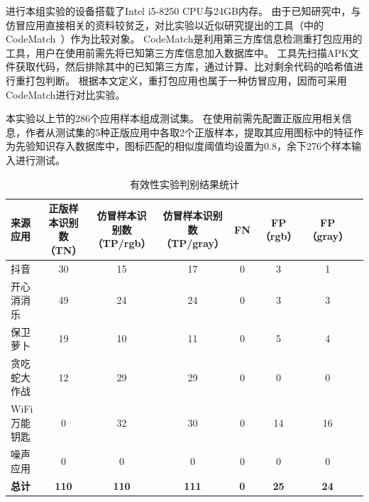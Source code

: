 进行本组实验的设备搭载了Intel i5-8250 CPU与24GB内存。
由于已知研究中，与仿冒应用直接相关的资料较贫乏，对比实验以近似研究提出的工具（中的CodeMatch~\cite{CodeMatch}）作为比较对象。
CodeMatch是利用第三方库信息检测重打包应用的工具，用户在使用前需先将已知第三方库信息加入数据库中。
工具先扫描APK文件获取代码，然后排除其中的已知第三方库，通过计算、比对剩余代码的哈希值进行重打包判断。
根据本文定义，重打包应用也属于一种仿冒应用，因而可采用CodeMatch进行对比实验。


本实验以上节的286个应用样本组成测试集。
\mytool 在使用前需先配置正版应用相关信息，作者从测试集的5种正版应用中各取2个正版样本，提取其应用图标中的特征作为先验知识存入数据库中，图标匹配的相似度阈值均设置为0.8，余下276个样本输入\mytool 进行测试。

\begin{table}[htbp]
    \renewcommand{\arraystretch}{1}
    \footnotesize
    \centering
    \caption{有效性实验判别结果统计}
    \vspace{1mm}
    \begin{tabular}{l ccccccc}
        \toprule
        \bf{来源应用}                  & \makecell[c]{\bf 正版样本识别数                                                     \\ \bf （TN）} & \makecell[c]{\bf 仿冒样本识别数 \\ \bf （TP/rgb）} & \makecell[c]{\bf 仿冒样本识别数 \\ \bf （TP/gray）} & {\bf FN} & \makecell[c]{\bf FP \\ \bf （rgb）} & \makecell[c]{\bf FP \\ \bf （gray）} \\
        \midrule
        抖音                           & 30                              & 15        & 17       & 0      & 3       & 1       \\
        \rowcolor{gray!15}开心消消乐   & 49                              & 24        & 24       & 0      & 3       & 3       \\
        保卫萝卜                       & 19                              & 10        & 11       & 0      & 5       & 4       \\
        \rowcolor{gray!15}贪吃蛇大作战 & 12                              & 29        & 29       & 0      & 0       & 0       \\
        WiFi万能钥匙                   & 0                               & 32        & 30       & 0      & 14      & 16      \\
        \rowcolor{gray!15}噪声应用     & 0                               & 0         & 0        & 0      & 0       & 0       \\
        {\bf 总计}                     & {\bf 110}                       & {\bf 110} & {\bf111} & {\bf0} & {\bf25} & {\bf24} \\
        \bottomrule
    \end{tabular}
    \label{table:exp_1_effectiveness}
\end{table}

